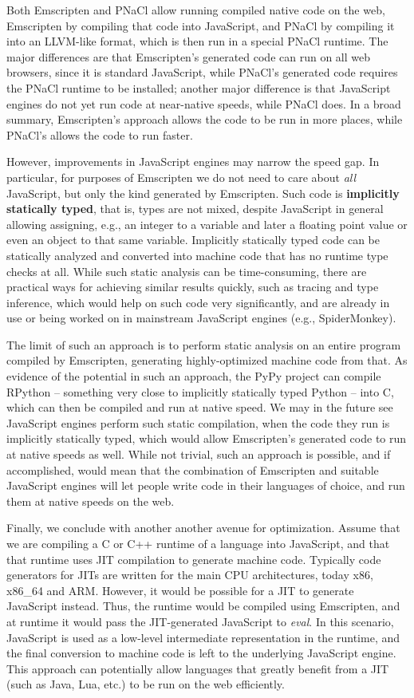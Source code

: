 \documentclass[11pt]{proc}
\begin{document}
Both Emscripten and PNaCl allow running compiled native code on
the web, Emscripten by compiling that code into JavaScript, and
PNaCl by compiling it into an LLVM-like format, which is then
run in a special PNaCl runtime. The major differences
are that Emscripten's generated code can run on all web browsers,
since it is standard JavaScript, while PNaCl's generated code
requires the PNaCl runtime to be installed; another major
difference is that JavaScript engines do not yet run code at
near-native speeds, while PNaCl does. In a broad summary, Emscripten's
approach allows the code to be run in more places, while PNaCl's
allows the code to run faster.

However, improvements in JavaScript engines may narrow the speed
gap. In particular, for purposes of Emscripten we do not need to
care about \emph{all} JavaScript, but only the kind generated by
Emscripten. Such code is \textbf{implicitly statically typed}, that is,
types are not mixed, despite JavaScript in general allowing assigning, e.g., an
integer to a variable and later a floating point value or even an object to that same variable. Implicitly statically
typed code can be statically analyzed and converted into
machine code that has no runtime type checks at all. While such
static analysis can be time-consuming, there are practical ways for
achieving similar results quickly, such as tracing and type inference, which
would help on such code very significantly, and are already in use
or being worked on in mainstream JavaScript engines (e.g., SpiderMonkey).

The limit of such an approach is to perform static analysis on
an entire program compiled by Emscripten, generating highly-optimized
machine code from that. As evidence of the potential in such an
approach, the PyPy project can compile RPython -- something very close to implicitly
statically typed Python -- into C, which can then be compiled
and run at native speed. We may in the future see
JavaScript engines perform such static compilation, when the code
they run is implicitly statically typed, which would allow Emscripten's generated
code to run at native speeds as well. While not trivial, such an
approach is possible, and if accomplished, would mean that
the combination of Emscripten and suitable JavaScript engines will
let people write code in their languages of choice, and run them
at native speeds on the web.

Finally, we conclude with another another avenue for optimization.
Assume that we are compiling a C or C++ runtime of a language
into JavaScript, and that that runtime uses JIT compilation to generate machine code. Typically
code generators for JITs are written for the main CPU architectures, today
x86, x86\_64 and ARM. However, it would be possible for a JIT to
generate JavaScript instead. Thus, the runtime would be compiled using
Emscripten, and at runtime it would pass the JIT-generated JavaScript to
\emph{eval}. In this
scenario, JavaScript is used as a low-level intermediate representation in
the runtime, and the final conversion to machine code is left to the underlying
JavaScript engine. This approach can potentially allow languages that 
greatly benefit from a JIT (such as Java, Lua, etc.) to be run on the web
efficiently.
\end{document}
